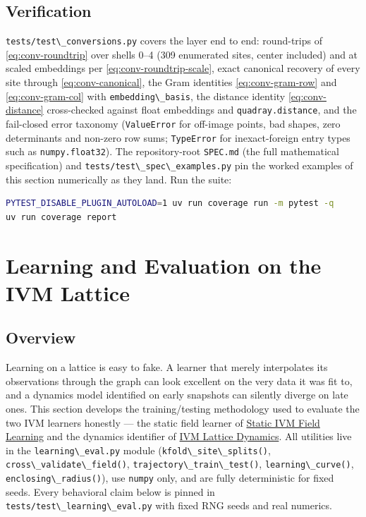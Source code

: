 \documentclass[
  10pt,
]{article}
\newcommand{\passthrough}[1]{#1}
\begin{document}
\subsection{Verification}\label{verification-1}

\passthrough{\lstinline!tests/test\_conversions.py!} covers the layer
end to end: round-trips of \eqref{eq:conv-roundtrip} over shells 0--4
(309 enumerated sites, center included) and at scaled embeddings per
\eqref{eq:conv-roundtrip-scale}, exact canonical recovery of every site
through \eqref{eq:conv-canonical}, the Gram identities
\eqref{eq:conv-gram-row} and \eqref{eq:conv-gram-col} with
\passthrough{\lstinline!embedding\_basis!}, the distance identity
\eqref{eq:conv-distance} cross-checked against float embeddings and
\passthrough{\lstinline!quadray.distance!}, and the fail-closed error
taxonomy (\passthrough{\lstinline!ValueError!} for off-image points, bad
shapes, zero determinants and non-zero row sums;
\passthrough{\lstinline!TypeError!} for inexact-foreign entry types such
as \passthrough{\lstinline!numpy.float32!}). The repository-root
\passthrough{\lstinline!SPEC.md!} (the full mathematical specification)
and \passthrough{\lstinline!tests/test\_spec\_examples.py!} pin the
worked examples of this section numerically as they land. Run the suite:

\begin{lstlisting}[language=bash]
PYTEST_DISABLE_PLUGIN_AUTOLOAD=1 uv run coverage run -m pytest -q
uv run coverage report
\end{lstlisting}

\newpage

\section{Learning and Evaluation on the IVM
Lattice}\label{learning-and-evaluation-on-the-ivm-lattice}

\subsection{Overview}\label{overview-8}

Learning on a lattice is easy to fake. A learner that merely
interpolates its observations through the graph can look excellent on
the very data it was fit to, and a dynamics model identified on early
snapshots can silently diverge on late ones. This section develops the
training/testing methodology used to evaluate the two IVM learners
honestly --- the static field learner of
\href{11_ivm_field_learning.md}{Static IVM Field Learning} and the
dynamics identifier of \href{12_ivm_dynamics.md}{IVM Lattice Dynamics}.
All utilities live in the \passthrough{\lstinline!learning\_eval.py!}
module (\passthrough{\lstinline!kfold\_site\_splits()!},
\passthrough{\lstinline!cross\_validate\_field()!},
\passthrough{\lstinline!trajectory\_train\_test()!},
\passthrough{\lstinline!learning\_curve()!},
\passthrough{\lstinline!enclosing\_radius()!}), use
\passthrough{\lstinline!numpy!} only, and are fully deterministic for
fixed seeds. Every behavioral claim below is pinned in
\passthrough{\lstinline!tests/test\_learning\_eval.py!} with fixed RNG
seeds and real numerics.
\end{document}

